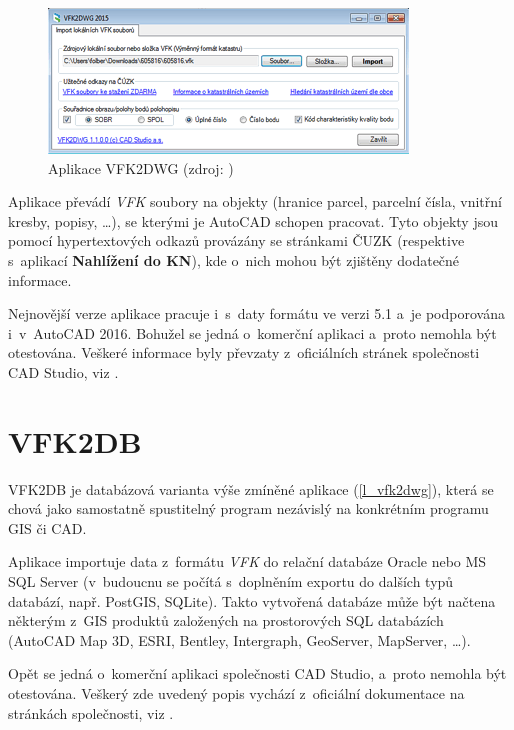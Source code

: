 \documentclass[a4paper,12pt,oneside]{book}
\begin{document}
\begin{figure}[htb]
\centering
\includegraphics[scale=0.85]{images/vfk2dwg-aplikace.png}
\caption[Aplikace VFK2DWG]{Aplikace VFK2DWG (zdroj: \cite{cadstudio-vfk2dwg})}
\end{figure}

Aplikace převádí \textit{VFK} soubory na objekty (hranice parcel, parcelní čísla, vnitřní kresby, popisy, \dots), se kterými je AutoCAD schopen pracovat. Tyto objekty jsou pomocí hypertextových odkazů provázány se stránkami ČUZK (respektive s~aplikací \textbf{Nahlížení do KN}), kde o~nich mohou být zjištěny dodatečné informace.


Nejnovější verze aplikace pracuje i~s~daty formátu ve verzi 5.1 a~je podporována i~v~AutoCAD 2016. Bohužel se jedná o~komerční aplikaci a~proto nemohla být otestována. Veškeré informace byly převzaty z~oficiálních stránek společnosti CAD Studio, viz \cite{cadstudio-vfk2dwg}.


\section{VFK2DB}
VFK2DB je databázová varianta výše zmíněné aplikace (\ref{l_vfk2dwg}), která se chová jako samostatně spustitelný program nezávislý na konkrétním programu GIS či CAD. 

Aplikace importuje data z~formátu \textit{VFK} do relační databáze Oracle nebo MS SQL Server (v~budoucnu se počítá s~doplněním exportu do dalších typů databází, např. PostGIS, SQLite). Takto vytvořená databáze může být načtena některým z~GIS produktů založených na prostorových SQL databázích (AutoCAD Map 3D, ESRI, Bentley, Intergraph, GeoServer, MapServer, \dots). 

Opět se jedná o~komerční aplikaci společnosti CAD Studio, a~proto nemohla být otestována. Veškerý zde uvedený popis vychází z~oficiální dokumentace na stránkách společnosti, viz \cite{cadstudio-vfk2db}.
\end{document}
